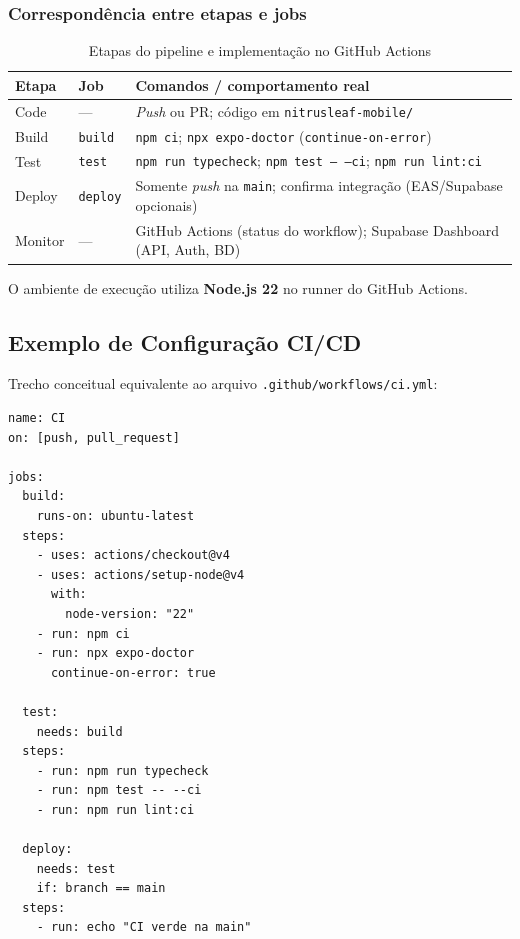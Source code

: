 \documentclass[11pt,a4paper]{article}
\begin{document}
\subsubsection{Correspondência entre etapas e jobs}

\begin{table}[H]
\centering
\caption{Etapas do pipeline e implementação no GitHub Actions}
\label{tab:cicd-jobs}
\small
\begin{tabular}{|l|l|p{7.2cm}|}
\hline
\textbf{Etapa} & \textbf{Job} & \textbf{Comandos / comportamento real} \\
\hline
Code & --- & \textit{Push} ou PR; código em \texttt{nitrusleaf-mobile/} \\
\hline
Build & \texttt{build} & \texttt{npm ci}; \texttt{npx expo-doctor} (\texttt{continue-on-error}) \\
\hline
Test & \texttt{test} & \texttt{npm run typecheck}; \texttt{npm test -- --ci}; \texttt{npm run lint:ci} \\
\hline
Deploy & \texttt{deploy} & Somente \textit{push} na \texttt{main}; confirma integração (EAS/Supabase opcionais) \\
\hline
Monitor & --- & GitHub Actions (status do workflow); Supabase Dashboard (API, Auth, BD) \\
\hline
\end{tabular}
\end{table}

O ambiente de execução utiliza \textbf{Node.js 22} no runner do GitHub Actions.

\subsection{Exemplo de Configuração CI/CD}

Trecho conceitual equivalente ao arquivo \texttt{.github/workflows/ci.yml}:

\begin{verbatim}
name: CI
on: [push, pull_request]

jobs:
  build:
    runs-on: ubuntu-latest
  steps:
    - uses: actions/checkout@v4
    - uses: actions/setup-node@v4
      with:
        node-version: "22"
    - run: npm ci
    - run: npx expo-doctor
      continue-on-error: true

  test:
    needs: build
  steps:
    - run: npm run typecheck
    - run: npm test -- --ci
    - run: npm run lint:ci

  deploy:
    needs: test
    if: branch == main
  steps:
    - run: echo "CI verde na main"
\end{verbatim}
\end{document}
